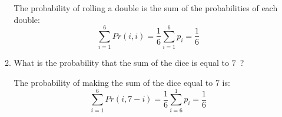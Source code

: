 \documentclass[a4paper,11pt]{exam}
\begin{document}
\begin{questions}
\begin{enumerate}
\begin{enumerate}
		\begin{solution}
			The probability of rolling a double is the sum of the probabilities of each double:
			\[
			\sum_{i=1}^6 Pr(i,i) = \frac{1}{6} \sum_{i=1}^6 p_i = \frac{1}{6}
			\]
		\end{solution}
		
		\item What is the probability that the sum of the dice is equal to $7$~?
		
		\begin{solution}
			The probability of making the sum of the dice equal to 7 is:
			\[
			\sum_{i=1}^6 Pr(i,7-i) = \frac{1}{6} \sum_{i=6}^1 p_i
			= \frac{1}{6}
			\]
		\end{solution}
	\end{enumerate}
\end{enumerate}


%





\end{questions}
\end{document}
